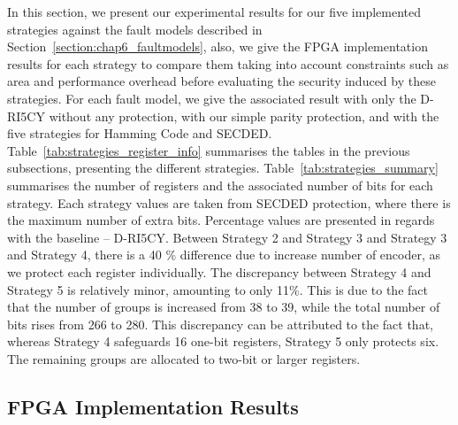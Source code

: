 In this section, we present our experimental results for our five implemented strategies against the fault models described in Section~\ref{section:chap6_faultmodels}, also, we give the FPGA implementation results for each strategy to compare them taking into account constraints such as area and performance overhead before evaluating the security induced by these strategies. For each fault model, we give the associated result with only the D-RI5CY without any protection, with our simple parity protection, and with the five strategies for Hamming Code and SECDED.
Table~\ref{tab:strategies_register_info} summarises the tables in the previous subsections, presenting the different strategies. Table~\ref{tab:strategies_summary} summarises the number of registers and the associated number of bits for each strategy. Each strategy values are taken from SECDED protection, where there is the maximum number of extra bits. Percentage values are presented in regards with the baseline -- D-RI5CY. Between Strategy 2 and Strategy 3 and Strategy 3 and Strategy 4, there is a 40 \% difference due to increase number of encoder, as we protect each register individually. The discrepancy between Strategy 4 and Strategy 5 is relatively minor, amounting to only 11\%. This is due to the fact that the number of groups is increased from 38 to 39, while the total number of bits rises from 266 to 280. This discrepancy can be attributed to the fact that, whereas Strategy 4 safeguards 16 one-bit registers, Strategy 5 only protects six. The remaining groups are allocated to two-bit or larger registers. 

\subsection{FPGA Implementation Results}

